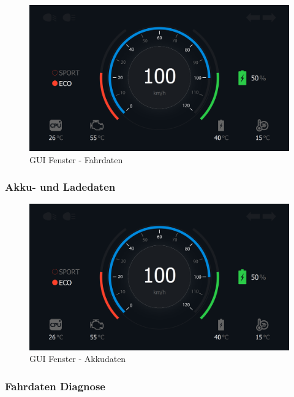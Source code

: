 \begin{figure}[H]
	\begin{center}
		\includegraphics[scale=0.24]{figures/hcis/window_dashboard.png}
		\caption{GUI Fenster - Fahrdaten}
	\end{center}
\end{figure}

\newpage

\subsubsection{Akku- und Ladedaten}

\begin{figure}[H]
	\begin{center}
		\includegraphics[scale=0.24]{figures/hcis/window_dashboard.png}
		\caption{GUI Fenster - Akkudaten}
	\end{center}
\end{figure}

\subsubsection{Fahrdaten Diagnose}

